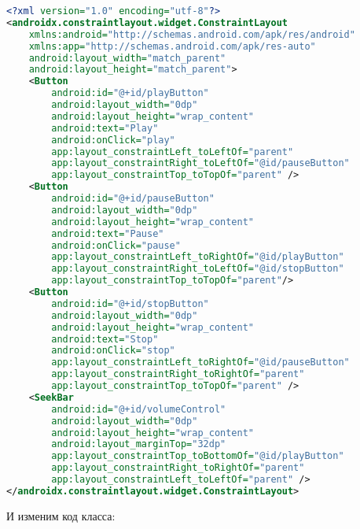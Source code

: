 \begin{lstlisting}[language=XML
	, label=lst:
	]
<?xml version="1.0" encoding="utf-8"?>
<androidx.constraintlayout.widget.ConstraintLayout
    xmlns:android="http://schemas.android.com/apk/res/android"
    xmlns:app="http://schemas.android.com/apk/res-auto"
    android:layout_width="match_parent"
    android:layout_height="match_parent">
    <Button
        android:id="@+id/playButton"
        android:layout_width="0dp"
        android:layout_height="wrap_content"
        android:text="Play"
        android:onClick="play"
        app:layout_constraintLeft_toLeftOf="parent"
        app:layout_constraintRight_toLeftOf="@id/pauseButton"
        app:layout_constraintTop_toTopOf="parent" />
    <Button
        android:id="@+id/pauseButton"
        android:layout_width="0dp"
        android:layout_height="wrap_content"
        android:text="Pause"
        android:onClick="pause"
        app:layout_constraintLeft_toRightOf="@id/playButton"
        app:layout_constraintRight_toLeftOf="@id/stopButton"
        app:layout_constraintTop_toTopOf="parent"/>
    <Button
        android:id="@+id/stopButton"
        android:layout_width="0dp"
        android:layout_height="wrap_content"
        android:text="Stop"
        android:onClick="stop"
        app:layout_constraintLeft_toRightOf="@id/pauseButton"
        app:layout_constraintRight_toRightOf="parent"
        app:layout_constraintTop_toTopOf="parent" />
    <SeekBar
        android:id="@+id/volumeControl"
        android:layout_width="0dp"
        android:layout_height="wrap_content"
        android:layout_marginTop="32dp"
        app:layout_constraintTop_toBottomOf="@id/playButton"
        app:layout_constraintRight_toRightOf="parent"
        app:layout_constraintLeft_toLeftOf="parent" />
</androidx.constraintlayout.widget.ConstraintLayout>
\end{lstlisting}

И изменим код класса:

